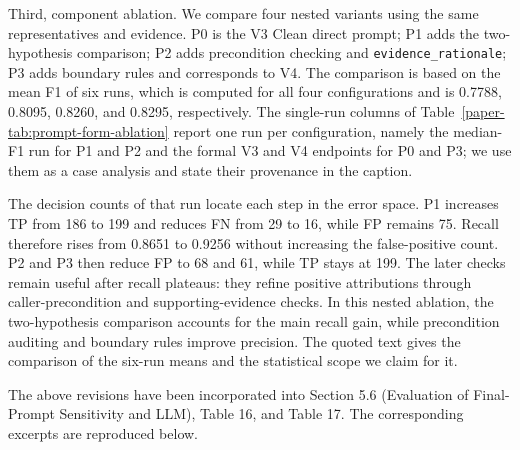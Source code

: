 \documentclass[onecolumn,11pt]{article}
\begin{document}
{Third, component ablation. We compare four nested variants using the same representatives and evidence. P0 is the V3 Clean direct prompt; P1 adds the two-hypothesis comparison; P2 adds precondition checking and \texttt{evidence\_rationale}; P3 adds boundary rules and corresponds to V4. The comparison is based on the mean F1 of six runs, which is computed for all four configurations and is 0.7788, 0.8095, 0.8260, and 0.8295, respectively. The single-run columns of Table~\ref{paper-tab:prompt-form-ablation} report one run per configuration, namely the median-F1 run for P1 and P2 and the formal V3 and V4 endpoints for P0 and P3; we use them as a case analysis and state their provenance in the caption.

The decision counts of that run locate each step in the error space. P1 increases TP from 186 to 199 and reduces FN from 29 to 16, while FP remains 75. Recall therefore rises from 0.8651 to 0.9256 without increasing the false-positive count. P2 and P3 then reduce FP to 68 and 61, while TP stays at 199. The later checks remain useful after recall plateaus: they refine positive attributions through caller-precondition and supporting-evidence checks. In this nested ablation, the two-hypothesis comparison accounts for the main recall gain, while precondition auditing and boundary rules improve precision. The quoted text gives the comparison of the six-run means and the statistical scope we claim for it.

The above revisions have been incorporated into Section 5.6 (Evaluation of Final-Prompt Sensitivity and LLM), Table 16, and Table 17. The corresponding excerpts are reproduced below.}
\end{document}
